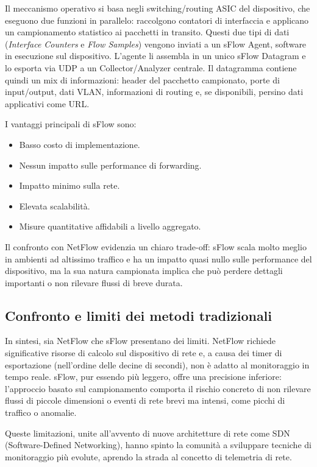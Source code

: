 Il meccanismo operativo si basa negli switching/routing ASIC del dispositivo,
che eseguono due funzioni in parallelo: raccolgono contatori di interfaccia
e applicano un campionamento statistico ai pacchetti in transito.
Questi due tipi di dati (\textit{Interface Counters} e \textit{Flow Samples})
vengono inviati a un sFlow Agent, software in esecuzione sul dispositivo.
L'agente li assembla in un unico sFlow Datagram e lo esporta via UDP a un
Collector/Analyzer centrale. Il datagramma contiene quindi un mix di
informazioni: header del pacchetto campionato, porte di input/output,
dati VLAN, informazioni di routing e, se disponibili, persino dati
applicativi come URL.

I vantaggi principali di sFlow sono:
\begin{itemize}
\item Basso costo di implementazione.
\item Nessun impatto sulle performance di forwarding.
\item Impatto minimo sulla rete.
\item Elevata scalabilità.
\item Misure quantitative affidabili a livello aggregato.
\end{itemize}

Il confronto con NetFlow evidenzia un chiaro trade-off: sFlow scala molto
meglio in ambienti ad altissimo traffico e ha un impatto quasi nullo sulle
performance del dispositivo, ma la sua natura campionata implica che può
perdere dettagli importanti o non rilevare flussi di breve durata.

\subsection{Confronto e limiti dei metodi tradizionali}

In sintesi, sia NetFlow che sFlow presentano dei limiti.
NetFlow richiede significative risorse di calcolo sul dispositivo di rete e,
a causa dei timer di esportazione (nell'ordine delle decine di secondi),
non è adatto al monitoraggio in tempo reale.
sFlow, pur essendo più leggero, offre una precisione inferiore: l'approccio
basato sul campionamento comporta il rischio concreto di non rilevare flussi
di piccole dimensioni o eventi di rete brevi ma intensi, come picchi di
traffico o anomalie.

Queste limitazioni, unite all'avvento di nuove architetture di rete come SDN
(Software-Defined Networking), hanno spinto la comunità a sviluppare tecniche
di monitoraggio più evolute, aprendo la strada al concetto di telemetria di rete.

